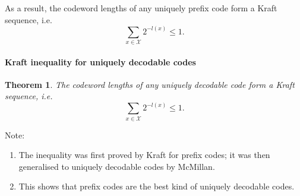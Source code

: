 \documentclass[a4paper, 11pt, openany]{book}
\numberwithin{equation}{section}
\theoremstyle{plain}
\newtheorem{theorem}	[equation]	{Theorem}
\theoremstyle{definition}
\newcommand{\alphabet}[1]{\mathcal{#1}}
\begin{document}
As a result, the codeword lengths of any uniquely prefix code form a Kraft sequence, i.e.
$$
	\sum_{x \in \alphabet{X}} 2^{-l(x)} \le 1.
$$






\paragraph{Kraft inequality for uniquely decodable codes}

\begin{theorem}
The codeword lengths of any uniquely decodable code form a Kraft sequence, i.e.
$$
	\sum_{x \in \alphabet{X}} 2^{-l(x)} \le 1.
$$
%
\end{theorem}

Note: 
\begin{enumerate}
	\item The inequality was first proved by Kraft for prefix codes; it was then generalised to uniquely decodable codes by McMillan.
	
	\item This shows that prefix codes are the best kind of uniquely decodable codes.
\end{enumerate}



% 
\end{document}
